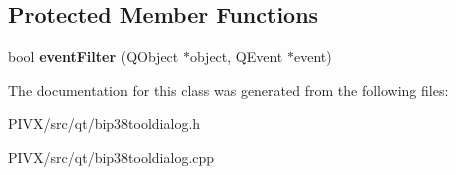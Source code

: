 \subsection*{Protected Member Functions}
\begin{DoxyCompactItemize}
\item 
\mbox{\label{class_bip38_tool_dialog_a68cc2da759d7c60f471eb14cee8e31bf}} 
bool {\bfseries event\+Filter} (Q\+Object $\ast$object, Q\+Event $\ast$event)
\end{DoxyCompactItemize}


The documentation for this class was generated from the following files\+:\begin{DoxyCompactItemize}
\item 
P\+I\+V\+X/src/qt/bip38tooldialog.\+h\item 
P\+I\+V\+X/src/qt/bip38tooldialog.\+cpp\end{DoxyCompactItemize}
